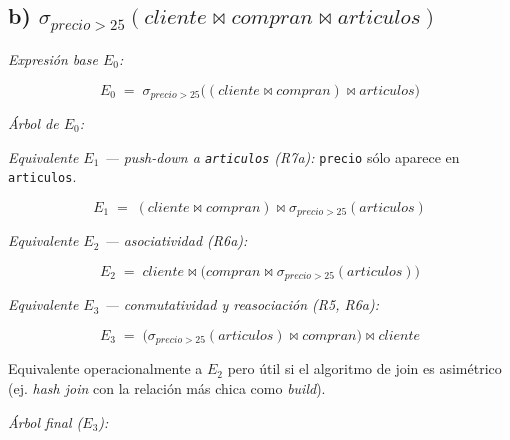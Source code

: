 \documentclass[11pt,a4paper]{article}
\newcommand{\sel}[1]{\sigma_{#1}}
\newcommand{\jn}{\bowtie}
\begin{document}
\subsection{b) $\sel{precio>25}(cliente \jn compran \jn articulos)$}

\textit{Expresión base $E_0$:}

\[
E_0 \;=\; \sel{precio>25}\!\big((cliente \jn compran) \jn articulos\big)
\]

\textit{Árbol de $E_0$:}

\begin{center}
\end{center}

\textit{Equivalente $E_1$ --- push-down a \texttt{articulos} (R7a):} \texttt{precio} sólo aparece en \texttt{articulos}.

\[
E_1 \;=\; (cliente \jn compran) \jn \sel{precio>25}(articulos)
\]

\textit{Equivalente $E_2$ --- asociatividad (R6a):}

\[
E_2 \;=\; cliente \jn \big(compran \jn \sel{precio>25}(articulos)\big)
\]

\textit{Equivalente $E_3$ --- conmutatividad y reasociación (R5, R6a):}

\[
E_3 \;=\; \big(\sel{precio>25}(articulos) \jn compran\big) \jn cliente
\]

Equivalente operacionalmente a $E_2$ pero útil si el algoritmo de join es asimétrico (ej. \emph{hash join} con la relación más chica como \emph{build}).

\textit{Árbol final ($E_3$):}

\begin{center}
\end{center}
\end{document}
